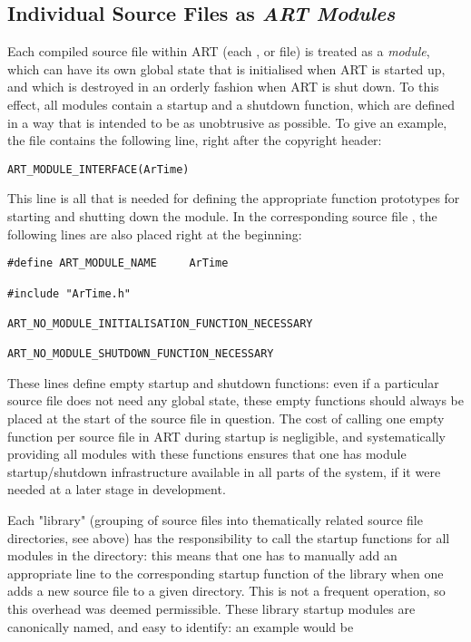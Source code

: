 \subsection{Individual Source Files as \emph{ART Modules}}

Each compiled source file within ART (\ie each ,  or  file) is treated as a \emph{module}, which can have its own global state that is initialised when ART is started up, and which is destroyed in an orderly fashion when ART is shut down. To this effect, all modules contain a startup and a shutdown function, which are defined in a way that is intended to be as unobtrusive as possible. To give an example, the file  contains the following line, right after the copyright header:

\begin{verbatim}
ART_MODULE_INTERFACE(ArTime)
\end{verbatim}

This line is all that is needed for defining the appropriate function prototypes for starting and shutting down the  module. In the corresponding source file , the following lines are also placed right at the beginning:

\begin{verbatim}
#define ART_MODULE_NAME     ArTime

#include "ArTime.h"

ART_NO_MODULE_INITIALISATION_FUNCTION_NECESSARY

ART_NO_MODULE_SHUTDOWN_FUNCTION_NECESSARY
\end{verbatim}

These lines define empty startup and shutdown functions: even if a particular source file does not need any global state, these empty functions should always be placed at the start of the source file in question. The cost of calling one empty function per source file in ART during startup is negligible, and systematically providing all modules with these functions ensures that one has module startup/shutdown infrastructure available in all parts of the system, if it were needed at a later stage in development.

Each "library" (\ie grouping of source files into thematically related source file directories, see above) has the responsibility to call the startup functions for all modules in the directory: this means that one has to manually add an appropriate line to the corresponding startup function of the library when one adds a new source file to a given directory. This is not a frequent operation, so this overhead was deemed permissible. These library startup modules are canonically named, and easy to identify: an example would be 


